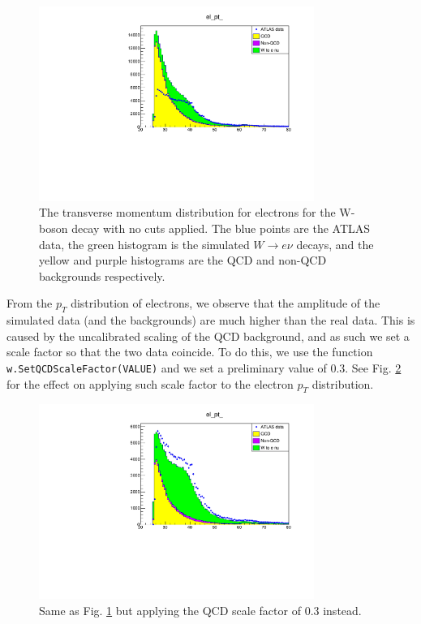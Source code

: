 \documentclass[a4paper]{report}
\numberwithin{equation}{section}
\begin{document}
\begin{figure}[htpb]
    \centering
    \includegraphics[width=0.8\textwidth]{elpt_nocuts.pdf}
    \caption{The transverse momentum distribution for electrons for the W-boson decay with no cuts applied. The blue points are the ATLAS data, 
    the green histogram is the simulated $W \rightarrow e\nu$ decays, and the yellow and purple histograms are the QCD and 
    non-QCD backgrounds respectively.}
    \label{fig:elpt_nocuts}
\end{figure}

From the $p_T$ distribution of electrons, we observe that the amplitude of the simulated data (and the backgrounds) are much 
higher than the real data. This is caused by the uncalibrated scaling of the QCD background, and as such we set a scale factor 
so that the two data coincide. To do this, we use the function \texttt{w.SetQCDScaleFactor(VALUE)} and we set a preliminary 
value of 0.3. See Fig. \ref{fig:elpt_qcd30} for the effect on applying such scale factor to the electron $p_T$ distribution. 

\begin{figure}[htpb]
    \centering
    \includegraphics[width=0.8\textwidth]{elpt_qcd30.pdf}
    \caption{Same as Fig. \ref{fig:elpt_nocuts} but applying the QCD scale factor of 0.3 instead.}
    \label{fig:elpt_qcd30}
\end{figure}
\end{document}
